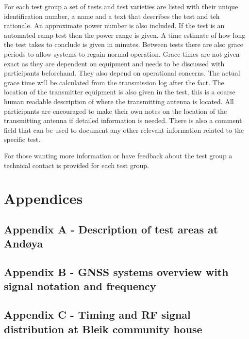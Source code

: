 \documentclass[a4paper]{book}
\begin{document}
For each test group a set of tests and test varieties are listed with their unique identification number, a name and a text that describes the test and teh rationale. An approximate power number is also included. If the test is an automated ramp test then the power range is given. A time estimate of how long the test takes to conclude is given in minutes. Between tests there are also grace periods to allow systems to regain normal operation. Grace  times are not given exact as they are dependent on equipment and needs to be discussed with participants beforehand. They also depend on operational concerns. The actual grace time will be calculated from the transmission log after the fact. The location of the transmitter equipment is also given in the test, this is a coarse human readable description of where the transmitting antenna is located. All participants are encouraged to make their own notes on the location of the transmitting antenna if detailed information is needed. There is also a comment field that can be used to document any other relevant information related to the specific test. \newline

For those wanting more information or have feedback about the test group a technical contact is provided for each test group. 




\chapter{Appendices}
\section{Appendix A - Description of test areas at Andøya}


\section{Appendix B - GNSS systems overview with signal notation and frequency}


\section{Appendix C - Timing and RF signal distribution at Bleik community house}

\end{document}
